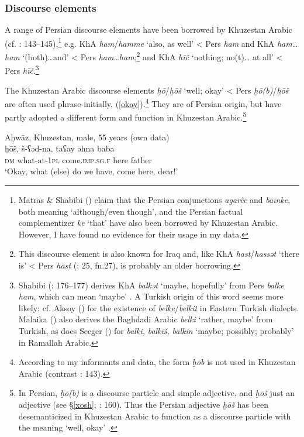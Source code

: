 \documentclass[output=paper,nonflat]{langsci/langscibook}
\begin{document}
\subsubsection{Discourse elements}

A range of Persian discourse elements have been borrowed by Khuzestan Arabic (cf. \citealt{MatrasShabibi2007}: 143–145),\footnote{Matras \& Shabibi (\citeyear[144]{MatrasShabibi2007}) claim that the Persian conjunctions \textit{agarče} and \textit{bāīnke}, both meaning ‘although/even though’, and the Persian factual complementizer \textit{ke} ‘that’ have also been borrowed by Khuzestan Arabic. However, I have found no evidence for their usage in my data.} e.g. KhA \textit{ham}/\textit{hamme} ‘also, as well’ < Pers \textit{ham} and KhA \textit{ham}…\textit{ham} ‘(both)…and’ < Pers \textit{ham}…\textit{ham};\footnote{This discourse element is also known for Iraq \citep[36]{Malaika1963} and, like KhA \textit{hast}/\textit{hassət} ‘there is’ < Pers \textit{hast} (\citealt{Ingham1973}: 25, fn.27), is probably an older borrowing.} and KhA \textit{hīč} ‘nothing; no(t)… at all’ < Pers \textit{hīč}.\footnote{Shabibi (\citeyear{Shabibi2006}: 176–177) derives KhA \textit{balkət} ‘maybe, hopefully’ from Pers \textit{balke} \textit{ham}, which can mean ‘maybe’ . A Turkish origin of this word seems more likely: cf. Aksoy (\citeyear[620]{Aksoy1963}) for the existence of \textit{belke}/\textit{belkit} in Eastern Turkish dialects. Malaika (\citeyear[35]{Malaika1963}) also derives the Baghdadi Arabic \textit{belki} ‘rather, maybe’ from Turkish, as does Seeger (\citeyear[28]{Seeger2009}) for \textit{balki,} \textit{balkīš,} \textit{balkin} ‘maybe; possibly; probably’ in Ramallah Arabic.} 

The Khuzestan Arabic discourse elements \textit{ḫō}/\textit{ḫōš} ‘well; okay’ < Pers \textit{ḫō(b)}/\textit{ḫōš} are often used phrase-initially, (\ref{okay}).\footnote{According to my informants and data, the form \textit{ḫōb} is not used in Khuzestan Arabic (contrast \citealt{MatrasShabibi2007}: 143).} They are of Persian origin, but have partly adopted a different form and function in Khuzestan Arabic.\footnote{In Persian, \textit{ḫō(b)} is a discourse particle and simple adjective, and \textit{ḫōš} just an adjective (see §\ref{xosh}; \citealt{Shabibi2006}: 160). Thus the Persian adjective \textit{ḫōš} has been desemanticized in Khuzestan Arabic to function as a discourse particle with the meaning ‘well, okay’ \citep[160]{Shabibi2006}.}

\ea\label{okay}
{Aḥwāz, Khuzestan, male, 55 years (own data)}\\
\gll ḫōš, š-ʕəd-na, taʕay əhna baba\\
     \textsc{dm} what-at-\textsc{1pl} come.\textsc{imp}.\textsc{sg.}\textsc{f} here father\\
\glt ‘Okay, what (else) do we have, come here, dear!’
\z
\end{document}
